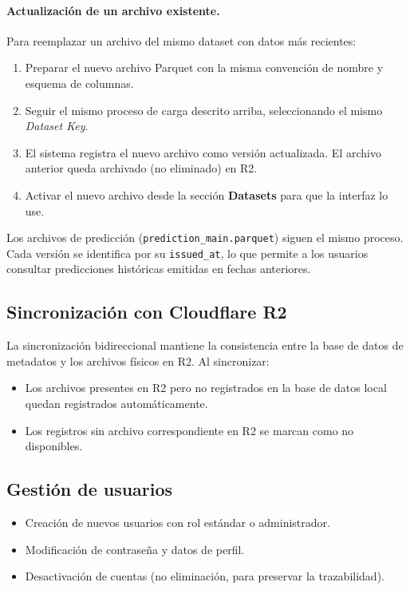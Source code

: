 \paragraph{Actualización de un archivo existente.}

Para reemplazar un archivo del mismo dataset con datos más recientes:
\begin{enumerate}
    \item Preparar el nuevo archivo Parquet con la misma convención de nombre y esquema de columnas.
    \item Seguir el mismo proceso de carga descrito arriba, seleccionando el mismo \textit{Dataset Key}.
    \item El sistema registra el nuevo archivo como versión actualizada. El archivo anterior queda archivado (no eliminado) en R2.
    \item Activar el nuevo archivo desde la sección \textbf{Datasets} para que la interfaz lo use.
\end{enumerate}

\begin{remark}
Los archivos de predicción (\texttt{prediction\_main.parquet}) siguen el mismo proceso. Cada versión se identifica por su \texttt{issued\_at}, lo que permite a los usuarios consultar predicciones históricas emitidas en fechas anteriores.
\end{remark}

\subsection*{Sincronización con Cloudflare R2}

La sincronización bidireccional mantiene la consistencia entre la base de datos de metadatos y los archivos físicos en R2. Al sincronizar:
\begin{itemize}
    \item Los archivos presentes en R2 pero no registrados en la base de datos local quedan registrados automáticamente.
    \item Los registros sin archivo correspondiente en R2 se marcan como no disponibles.
\end{itemize}

\subsection*{Gestión de usuarios}

\begin{itemize}
    \item Creación de nuevos usuarios con rol estándar o administrador.
    \item Modificación de contraseña y datos de perfil.
    \item Desactivación de cuentas (no eliminación, para preservar la trazabilidad).
\end{itemize}
